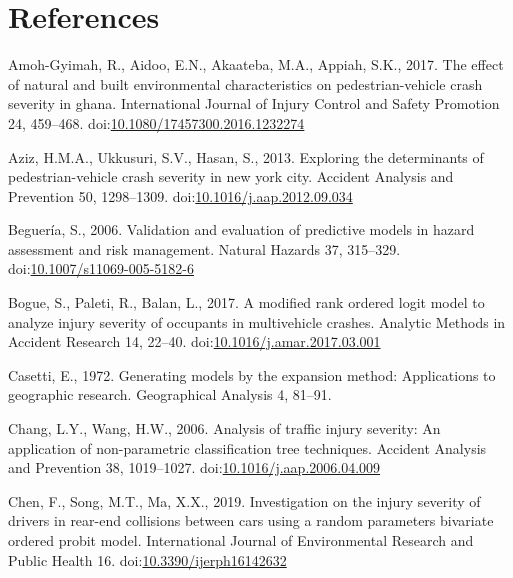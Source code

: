 \documentclass[]{elsarticle} %
\begin{document}
\endgroup{}

\hypertarget{references}{%
\section*{References}\label{references}}

\hypertarget{refs}{}
\leavevmode\hypertarget{ref-Amoh2017effect}{}%
Amoh-Gyimah, R., Aidoo, E.N., Akaateba, M.A., Appiah, S.K., 2017. The
effect of natural and built environmental characteristics on
pedestrian-vehicle crash severity in ghana. International Journal of
Injury Control and Safety Promotion 24, 459--468.
doi:\href{https://doi.org/10.1080/17457300.2016.1232274}{10.1080/17457300.2016.1232274}

\leavevmode\hypertarget{ref-Aziz2013exploring}{}%
Aziz, H.M.A., Ukkusuri, S.V., Hasan, S., 2013. Exploring the
determinants of pedestrian-vehicle crash severity in new york city.
Accident Analysis and Prevention 50, 1298--1309.
doi:\href{https://doi.org/10.1016/j.aap.2012.09.034}{10.1016/j.aap.2012.09.034}

\leavevmode\hypertarget{ref-Begueria2006validation}{}%
Beguería, S., 2006. Validation and evaluation of predictive models in
hazard assessment and risk management. Natural Hazards 37, 315--329.
doi:\href{https://doi.org/10.1007/s11069-005-5182-6}{10.1007/s11069-005-5182-6}

\leavevmode\hypertarget{ref-Bogue2017modified}{}%
Bogue, S., Paleti, R., Balan, L., 2017. A modified rank ordered logit
model to analyze injury severity of occupants in multivehicle crashes.
Analytic Methods in Accident Research 14, 22--40.
doi:\href{https://doi.org/10.1016/j.amar.2017.03.001}{10.1016/j.amar.2017.03.001}

\leavevmode\hypertarget{ref-Casetti1972generating}{}%
Casetti, E., 1972. Generating models by the expansion method:
Applications to geographic research. Geographical Analysis 4, 81--91.

\leavevmode\hypertarget{ref-Chang2006analysis}{}%
Chang, L.Y., Wang, H.W., 2006. Analysis of traffic injury severity: An
application of non-parametric classification tree techniques. Accident
Analysis and Prevention 38, 1019--1027.
doi:\href{https://doi.org/10.1016/j.aap.2006.04.009}{10.1016/j.aap.2006.04.009}

\leavevmode\hypertarget{ref-Chen2019investigation}{}%
Chen, F., Song, M.T., Ma, X.X., 2019. Investigation on the injury
severity of drivers in rear-end collisions between cars using a random
parameters bivariate ordered probit model. International Journal of
Environmental Research and Public Health 16.
doi:\href{https://doi.org/10.3390/ijerph16142632}{10.3390/ijerph16142632}
\end{document}
